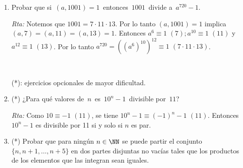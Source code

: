 \documentclass[12pt,spanish,makeidx]{amsbook}
\newcommand{\rta}{\noindent\textit{Rta: }}
\newcommand{\espm}{{\,\,}}
\begin{document}
\begin{enumerate}
\begin{enumerate}
		
	\end{enumerate}
	
	\smallskip
	
	
	
	
	
	\item Probar que si \,$(a,1001)=1$\, entonces \,$1001$\, divide a \,$a^{720}-1$.
	
	\rta Notemos que $1001=7\cdot11\cdot13$. Por lo tanto $(a, 1001) = 1$ implica $(a,7)=(a,11)=(a,13)=1$.
	Entonces $a^6\equiv1 \espm(7); a^{10}\equiv1 \espm(11)$ y $ a^{12}\equiv1 \espm(13)$.
	Por lo tanto $a^{720}=((a^6)^{10})^{12}\equiv 1 \espm(7\cdot11\cdot13)$.
	
	\smallskip
	
	
	\
	
	
	\noindent (*): ejercicios opcionales de mayor dificultad.
	
	\smallskip
	
	\item (*) ¿Para qu\'e valores de \,$n$\, es \,$10^n-1$\, divisible por \,$11$?
	
	\rta Como $10\equiv -1 \espm(11)$, se tiene $10^{n}-1\equiv(-1)^n-1 \espm(11)$. Entonces $10^n-1$ es divisible por 11 si y solo si $n$ es par.
	
	\smallskip
	
	\item (*) Probar que para ningún $n\in\NN$ se puede partir el conjunto $\{n,n+1,\ldots, n+5\}$ en dos partes
	disjuntas no vacías tales que los productos de los elementos que las integran sean iguales.
	

\end{enumerate}
\end{document}
